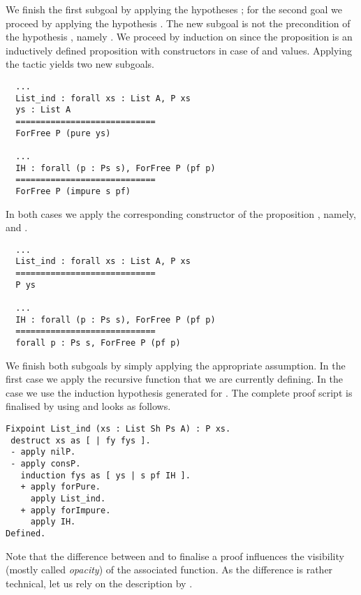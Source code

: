 We finish the first subgoal by applying the hypotheses ; for the second goal we proceed by applying the hypothesis
.
The new subgoal is not the precondition of the hypothesis
, namely .
We proceed by induction on  since the proposition
 is an inductively defined proposition with constructors
in case of  and  values.
Applying the tactic  yields
two new subgoals.

\begin{verbatim}
  ...
  List_ind : forall xs : List A, P xs
  ys : List A
  ============================
  ForFree P (pure ys)

  ...
  IH : forall (p : Ps s), ForFree P (pf p)
  ============================
  ForFree P (impure s pf)
\end{verbatim}

In both cases we apply the corresponding constructor of the
proposition , namely,  and
.

\begin{verbatim}
  ...
  List_ind : forall xs : List A, P xs
  ============================
  P ys

  ...
  IH : forall (p : Ps s), ForFree P (pf p)
  ============================
  forall p : Ps s, ForFree P (pf p)
\end{verbatim}

We finish both subgoals by simply applying the appropriate assumption.
In the first case we apply the recursive function  that
we are currently defining.
In the  case we use the induction hypothesis generated
for .
The complete proof script is finalised by using  and
looks as follows.

\begin{verbatim}
Fixpoint List_ind (xs : List Sh Ps A) : P xs.
 destruct xs as [ | fy fys ].
 - apply nilP.
 - apply consP.
   induction fys as [ ys | s pf IH ].
   + apply forPure.
     apply List_ind.
   + apply forImpure.
     apply IH.
Defined.
\end{verbatim}

Note that the difference between  and  to
finalise a proof influences the visibility (mostly called
\emph{opacity}) of the associated function.
As the difference is rather technical, let us rely on the description
by \cite{chlipala2011certified}.

